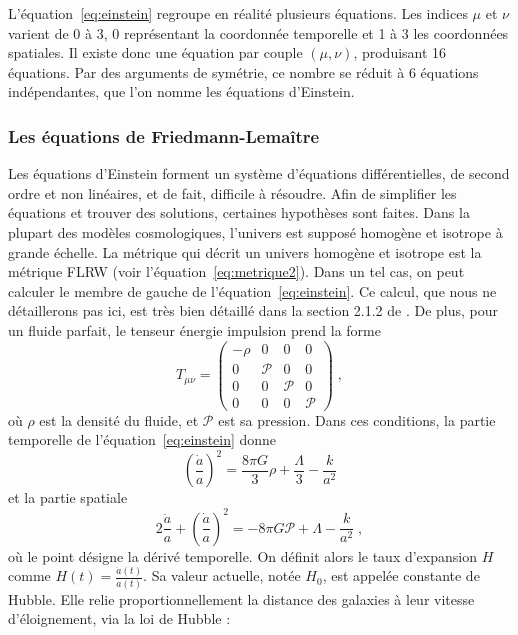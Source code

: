 L'équation~\ref{eq:einstein} regroupe en réalité plusieurs équations. Les indices $\mu$ et $\nu$ varient de 0 à 3, 0 représentant la coordonnée temporelle et 1 à 3 les coordonnées spatiales. Il existe donc une équation par couple $(\mu, \nu)$, produisant 16 équations. Par des arguments de symétrie, ce nombre se réduit à 6 équations indépendantes, que l'on nomme les équations d'Einstein.

\subsubsection{Les équations de Friedmann-Lemaître}
Les équations d'Einstein forment un système d'équations différentielles, de second ordre et non linéaires, et de fait, difficile à résoudre. Afin de simplifier les équations et trouver des solutions, certaines hypothèses sont faites. Dans la plupart des modèles cosmologiques, l'univers est supposé homogène et isotrope à grande échelle.
La métrique qui décrit un univers homogène et isotrope est la métrique FLRW (voir l'équation~\ref{eq:metrique2}).
Dans un tel cas, on peut calculer le membre de gauche de l'équation~\ref{eq:einstein}. Ce calcul, que nous ne détaillerons pas ici, est très bien détaillé dans la section 2.1.2 de \textcite{Dodelson2003}. De plus, pour un fluide parfait, le tenseur énergie impulsion prend la forme
\begin{equation}
  T_{\mu \nu} =
  \begin{pmatrix}
    -\rho & 0 & 0 & 0 \\
    0 & \mathcal{P} & 0 & 0\\
    0 & 0 & \mathcal{P} & 0\\
    0 & 0 & 0 & \mathcal{P}
  \end{pmatrix}  \; ,
\end{equation}
où $\rho$ est la densité du fluide, et $\mathcal{P}$ est sa pression. Dans ces conditions, la partie temporelle de l'équation~\ref{eq:einstein} donne
\begin{equation}
  \label{eq:friedmann1}
  \left(\frac{\dot{a}}{a}\right)^2 = \frac{8 \pi G}{3}\rho + \frac{\Lambda}{3} - \frac{k}{a^2} 
\end{equation}
et la partie spatiale
\begin{equation}
  \label{eq:friedmann2}
  2 \frac{\ddot{a}}{a} + \left(\frac{\dot{a}}{a}\right)^2 = - 8 \pi G \mathcal{P} + \Lambda - \frac{k}{a^2}  \; ,
\end{equation}
où le point désigne la dérivé temporelle. On définit alors le taux d'expansion $H$ comme $H(t) = \frac{\dot{a}(t)}{a(t)}$. Sa valeur actuelle, notée $H_0$, est appelée constante de Hubble. Elle relie proportionnellement la distance des galaxies à leur vitesse d'éloignement, via la loi de Hubble :
